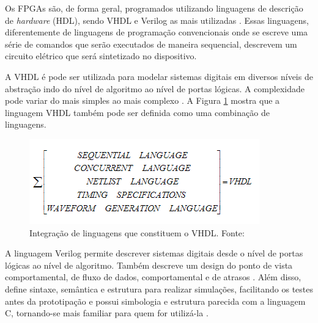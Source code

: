 Os FPGAs são, de forma geral, programados utilizando linguagens de descrição de \textit{hardware} (HDL), sendo VHDL e Verilog as mais utilizadas \cite{Ain}. Essas linguagens, diferentemente de linguagens de programação convencionais onde se escreve uma série de comandos que serão executados de maneira sequencial, descrevem um circuito elétrico que será sintetizado no dispositivo.

A VHDL é pode ser utilizada para modelar sistemas digitais em diversos níveis de abstração indo do nível de algoritmo ao nível de portas lógicas. A complexidade pode variar do mais simples ao mais complexo \cite{Wunnava}. A Figura \ref{fig:Vhdl} mostra que a linguagem VHDL também pode ser definida como uma combinação de linguagens.

\begin{figure}[H]
    \centering
    \includegraphics[scale=0.8]{figures/ReferencialTeorico/Vhdl.png}
    \caption{Integração de linguagens que constituem o VHDL. Fonte: \cite{Wunnava}}
    \label{fig:Vhdl}
\end{figure}


A linguagem Verilog permite descrever sistemas digitais desde o nível de portas lógicas ao nível de algoritmo. Também descreve um design do ponto de vista comportamental, de fluxo de dados, comportamental e de atrasos \cite{Bhasker}. Além disso, define sintaxe, semântica e estrutura para realizar simulações, facilitando os testes antes da prototipação e possui simbologia e estrutura parecida com a linguagem C, tornando-se mais familiar para quem for utilizá-la \cite{Wunnava}.

